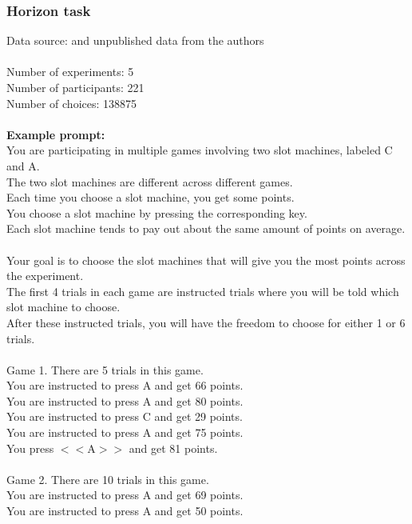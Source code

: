 \documentclass[pdflatex,sn-nature]{sn-jnl}%
\theoremstyle{thmstyleone}%
\theoremstyle{thmstyletwo}%
\theoremstyle{thmstylethree}%
\begin{document}
\subsubsection*{Horizon task}
Data source: \cite{wilson2014humans} and unpublished data from the authors \\ $~$ \\
Number of experiments: 5 $~$\\ 
Number of participants: 221 $~$\\ 
Number of choices: 138875 $~$\\ 
 $~$\\ 
\textbf{Example prompt:}
 $~$\\ 
You are participating in multiple games involving two slot machines, labeled C and A. $~$\\ 
The two slot machines are different across different games. $~$\\ 
Each time you choose a slot machine, you get some points. $~$\\ 
You choose a slot machine by pressing the corresponding key. $~$\\ 
Each slot machine tends to pay out about the same amount of points on average. $~$\\ 
Your goal is to choose the slot machines that will give you the most points across the experiment. $~$\\ 
The first 4 trials in each game are instructed trials where you will be told which slot machine to choose. $~$\\ 
After these instructed trials, you will have the freedom to choose for either 1 or 6 trials. $~$\\ 
 $~$\\ 
Game 1. There are 5 trials in this game. $~$\\ 
You are instructed to press A and get 66 points. $~$\\ 
You are instructed to press A and get 80 points. $~$\\ 
You are instructed to press C and get 29 points. $~$\\ 
You are instructed to press A and get 75 points. $~$\\ 
You press $<<$A$>>$ and get 81 points. $~$\\ 
 $~$\\ 
Game 2. There are 10 trials in this game. $~$\\ 
You are instructed to press A and get 69 points. $~$\\ 
You are instructed to press A and get 50 points. $~$\\ 
\end{document}
